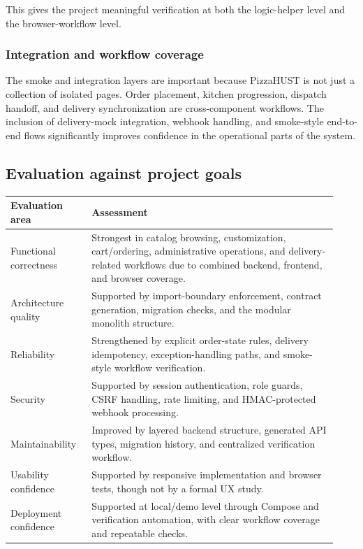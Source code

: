 This gives the project meaningful verification at both the logic-helper level and the browser-workflow level.

\subsubsection{Integration and workflow coverage}

The smoke and integration layers are important because PizzaHUST is not just a collection of isolated pages. Order placement, kitchen progression, dispatch handoff, and delivery synchronization are cross-component workflows. The inclusion of delivery-mock integration, webhook handling, and smoke-style end-to-end flows significantly improves confidence in the operational parts of the system.

\subsection{Evaluation against project goals}

\begingroup
\small
\setlength{\LTpre}{0.4em}
\setlength{\LTpost}{0.8em}
\label{tab:project-evaluation}
\begin{tabular}{L{0.23\linewidth} L{0.70\linewidth}}
\toprule
\textbf{Evaluation area} & \textbf{Assessment} \\
\midrule
Functional correctness & Strongest in catalog browsing, customization, cart/ordering, administrative operations, and delivery-related workflows due to combined backend, frontend, and browser coverage. \\
Architecture quality & Supported by import-boundary enforcement, contract generation, migration checks, and the modular monolith structure. \\
Reliability & Strengthened by explicit order-state rules, delivery idempotency, exception-handling paths, and smoke-style workflow verification. \\
Security & Supported by session authentication, role guards, CSRF handling, rate limiting, and HMAC-protected webhook processing. \\
Maintainability & Improved by layered backend structure, generated API types, migration history, and centralized verification workflow. \\
Usability confidence & Supported by responsive implementation and browser tests, though not by a formal UX study. \\
Deployment confidence & Supported at local/demo level through Compose and verification automation, with clear workflow coverage and repeatable checks. \\
\bottomrule
\end{tabular}
\endgroup

